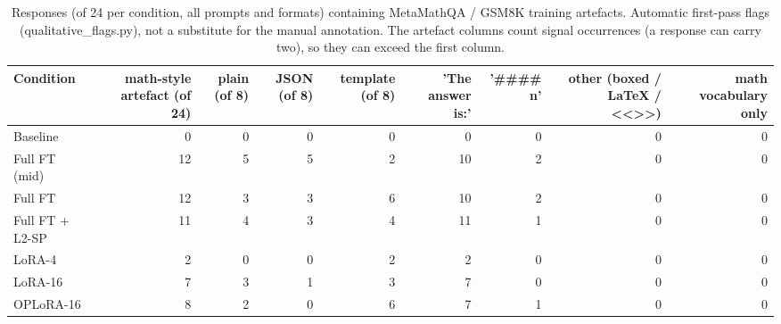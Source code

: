 \begin{table}[t]
\centering\small
\begin{tabular}{lrrrrrrrr}
\toprule
Condition & math-style artefact (of 24) & plain (of 8) & JSON (of 8) & template (of 8) & 'The answer is:' & '\#\#\#\# n' & other (boxed / LaTeX / <<>>) & math vocabulary only \\
\midrule
Baseline & 0 & 0 & 0 & 0 & 0 & 0 & 0 & 0 \\
Full FT (mid) & 12 & 5 & 5 & 2 & 10 & 2 & 0 & 0 \\
Full FT & 12 & 3 & 3 & 6 & 10 & 2 & 0 & 0 \\
Full FT + L2-SP & 11 & 4 & 3 & 4 & 11 & 1 & 0 & 0 \\
LoRA-4 & 2 & 0 & 0 & 2 & 2 & 0 & 0 & 0 \\
LoRA-16 & 7 & 3 & 1 & 3 & 7 & 0 & 0 & 0 \\
OPLoRA-16 & 8 & 2 & 0 & 6 & 7 & 1 & 0 & 0 \\
\bottomrule
\end{tabular}
\caption{Responses (of 24 per condition, all prompts and formats) containing MetaMathQA / GSM8K training artefacts. Automatic first-pass flags (qualitative\_flags.py), not a substitute for the manual annotation. The artefact columns count signal occurrences (a response can carry two), so they can exceed the first column.}
\label{tab:task1_qualitative_math_intrusion}
\end{table}
